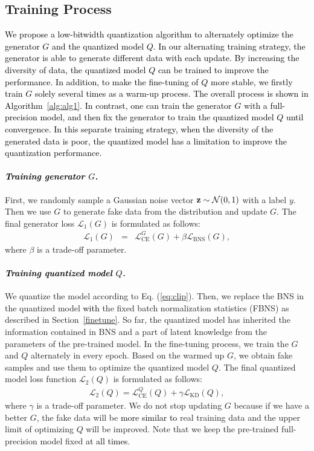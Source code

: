 \documentclass[runningheads]{llncs}
\def\onehot{\mathrm{CE}}
\def\kd{\mathrm{KD}}
\def\bns{\mathrm{BNS}}
\def\mL{{\mathcal L}}
\def\mN{{\mathcal N}}
\def\bz{{\bf z}}
\def\bz{{\bf z}}
\def\jie{\textcolor{black}}
\def\new{\textcolor{black}}
\begin{document}
\subsection{Training Process}
\label{train_process}
\jie{We propose a low-bitwidth quantization algorithm to alternately optimize the generator $G$ and the quantized model $Q$.
In our alternating training strategy, the generator is able to generate different data with each update.
By increasing the diversity of data, the quantized model $Q$ can be trained to improve the performance.
\new{In addition}, to make the fine-tuning of $Q$ more stable, we firstly train $G$ solely several times as a warm-up process.
The overall process is shown in Algorithm~\ref{alg:alg1}.
In contrast, one can train the generator $G$ with a full-precision model, and then fix the generator to train the quantized model $Q$ until convergence.
In this separate training strategy, when the diversity of the generated data is poor, the quantized model has a limitation to improve the quantization performance. 
}


\paragraph{\emph{\textbf{\jie{Training generator $G$.}}}}
First, we randomly sample a Gaussian noise vector $\bz \sim \mN (0,1)$ with a label $y$. 
Then we use $G$ to generate fake data from the distribution and update $G$. 
The final generator loss $\mL_{1}(G)$ is formulated as follows:
\begin{eqnarray}
\label{eq:loss_G}
\mL_{1}(G)&=&\mL^G_\onehot(G) + \beta\mL_\bns(G),
\end{eqnarray}
where $\beta$ is a trade-off parameter.




\paragraph{\emph{\textbf{\jie{Training quantized model $Q$.}}}}
We quantize the model according to Eq. (\ref{eq:clip}).
Then, we replace the BNS in the quantized model \new{with} the fixed batch normalization statistics (FBNS) as described in Section~\ref{finetune}.
So far, the quantized model has inherited the information contained in BNS and a part of latent knowledge from the parameters of the pre-trained model.
In the fine-tuning process, we train the $G$ and $Q$ alternately in every epoch.
Based on the warmed up $G$, we obtain fake samples and use them to optimize the quantized model $Q$. The final quantized model loss function $\mL_{2}(Q)$ is formulated as follows:
\begin{eqnarray}
\label{eq:loss_D}
\mL_{2}(Q)=\mL^Q_\onehot(Q)+\gamma\mL_{\kd}(Q),
\end{eqnarray}
where $\gamma$ is a trade-off parameter.
We do not stop updating $G$ because if we have a better $G$,  the fake data will be \new{more similar to} real training data and the upper limit of optimizing $Q$ will be improved.
Note that we keep the pre-trained full-precision model fixed \new{at all times}.
\end{document}
